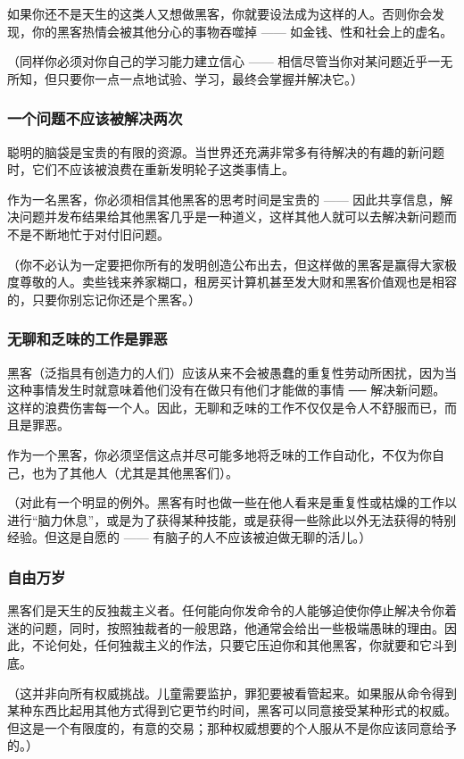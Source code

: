 如果你还不是天生的这类人又想做黑客，你就要设法成为这样的人。否则你会发现，你的黑客热情会被其他分心的事物吞噬掉 —— 如金钱、性和社会上的虚名。

（同样你必须对你自己的学习能力建立信心 —— 相信尽管当你对某问题近乎一无所知，但只要你一点一点地试验、学习，最终会掌握并解决它。）


\subsubsection{一个问题不应该被解决两次}
聪明的脑袋是宝贵的有限的资源。当世界还充满非常多有待解决的有趣的新问题时，它们不应该被浪费在重新发明轮子这类事情上。

作为一名黑客，你必须相信其他黑客的思考时间是宝贵的 —— 因此共享信息，解决问题并发布结果给其他黑客几乎是一种道义，这样其他人就可以去解决新问题而不是不断地忙于对付旧问题。

（你不必认为一定要把你所有的发明创造公布出去，但这样做的黑客是赢得大家极度尊敬的人。卖些钱来养家糊口，租房买计算机甚至发大财和黑客价值观也是相容的，只要你别忘记你还是个黑客。）


\subsubsection{无聊和乏味的工作是罪恶}
黑客（泛指具有创造力的人们）应该从来不会被愚蠢的重复性劳动所困扰，因为当这种事情发生时就意味着他们没有在做只有他们才能做的事情 ── 解决新问题。这样的浪费伤害每一个人。因此，无聊和乏味的工作不仅仅是令人不舒服而已，而且是罪恶。

作为一个黑客，你必须坚信这点并尽可能多地将乏味的工作自动化，不仅为你自己，也为了其他人（尤其是其他黑客们）。

（对此有一个明显的例外。黑客有时也做一些在他人看来是重复性或枯燥的工作以进行“脑力休息”，或是为了获得某种技能，或是获得一些除此以外无法获得的特别经验。但这是自愿的 —— 有脑子的人不应该被迫做无聊的活儿。）


\subsubsection{自由万岁}
黑客们是天生的反独裁主义者。任何能向你发命令的人能够迫使你停止解决令你着迷的问题，同时，按照独裁者的一般思路，他通常会给出一些极端愚昧的理由。因此，不论何处，任何独裁主义的作法，只要它压迫你和其他黑客，你就要和它斗到底。

（这并非向所有权威挑战。儿童需要监护，罪犯要被看管起来。如果服从命令得到某种东西比起用其他方式得到它更节约时间，黑客可以同意接受某种形式的权威。但这是一个有限度的，有意的交易；那种权威想要的个人服从不是你应该同意给予的。）

